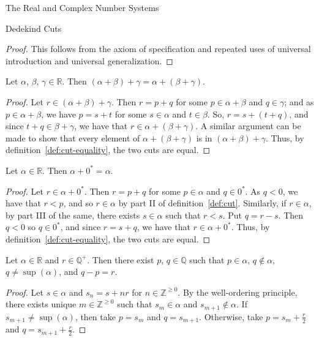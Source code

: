 \begin{chapter}{The Real and Complex Number Systems}
\begin{section}{Dedekind Cuts}
	\begin{proof}
		This follows from the axiom of specification and repeated uses of universal
		introduction and universal generalization.
	\end{proof}

	\begin{theorem}
		\label{thm:cut-addition-associativity}
		Let $\alpha$, $\beta$, $\gamma \in \mathbb{R}$. Then $(\alpha + \beta) + 
		\gamma = \alpha + (\beta + \gamma)$.
	\end{theorem}

	\begin{proof}
		Let $r \in (\alpha + \beta) + \gamma$. Then $r = p + q$ for some $p
		\in \alpha + \beta$ and $q \in \gamma$; and as $p \in \alpha + \beta$,
		we have $p = s + t$ for some $s \in \alpha$ and $t \in \beta$. So,
		$r = s + (t + q)$, and since $t + q \in \beta + \gamma$, we have that
		$r \in \alpha + (\beta + \gamma)$. A similar argument can be made to show
		that every element of $\alpha + (\beta + \gamma)$ is in $(\alpha +
		\beta) + \gamma$. Thus, by definition~\ref{def:cut-equality}, the two cuts
		are equal.
	\end{proof}

	\begin{theorem}
		\label{thm:cut-additive-identity}
		Let $\alpha \in \mathbb{R}$. Then $\alpha + 0^* = \alpha$.
	\end{theorem}

	\begin{proof}
		Let $r \in \alpha + 0^*$. Then $r = p + q$ for some $p \in \alpha$
		and $q \in 0^*$. As $q < 0$, we have that $r < p$, and so $r \in \alpha$ by
		part II of definition~\ref{def:cut}. Similarly, if $r \in \alpha$, by part III
		of the same, there exists $s \in \alpha$ such that
		$r < s$. Put $q = r - s$. Then $q < 0$ so $q \in 0^*$, and since
		$r = s + q$, we have that $r \in \alpha + 0^*$. Thus, by
		definition~\ref{def:cut-equality}, the two cuts are equal.
	\end{proof}

	\begin{theorem}
		\label{thm:exists-cut-rational-difference}
		Let $\alpha \in \mathbb{R}$ and $r \in \mathbb{Q}^+$. Then there exist 
		$p$, $q \in \mathbb{Q}$ such that $p \in \alpha$, $q \nin \alpha$, $q
		\neq \sup(\alpha)$, and $q - p = r$.
	\end{theorem}

	\begin{proof}
		Let $s \in \alpha$ and $s_n = s + n r$ for $n \in \mathbb{Z}^{\geq
		0}$. By the well-ordering principle, there exists unique $m \in \mathbb{Z}
		^{\geq 0}$ such that $s_m \in \alpha$ and $s_{m + 1} \nin \alpha$. If
		$s_{m + 1} \neq \sup(\alpha)$, then take $p = s_m$ and $q = s_{m +
		1}$. Otherwise, take $p = s_m + \frac{r}{2}$ and $q = s_{m + 1} +
		\frac{r}{2}$.
	\end{proof}


\end{section}
\end{chapter}
